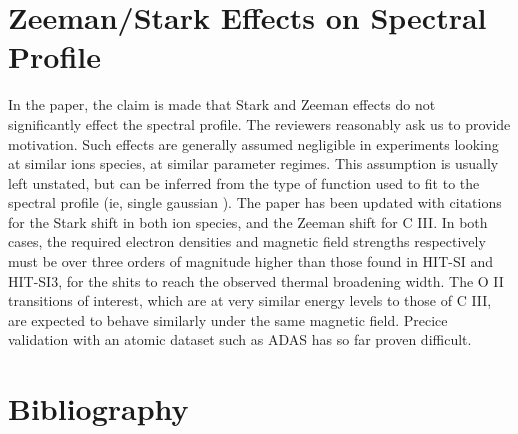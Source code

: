 \documentclass[]{AIAA}
\begin{document}
\section{Zeeman/Stark Effects on Spectral Profile}
\hspace*{4ex}In the paper, the claim is made that Stark and Zeeman effects do not significantly effect the spectral profile. The reviewers reasonably ask us to provide motivation. Such effects are generally assumed negligible in experiments looking at similar ions species, at similar parameter regimes\cite{cothran2006fast}. This assumption is usually left unstated, but can be inferred from the type of function used to fit to the spectral profile (ie, single gaussian \cite{den2006advances}). The paper has been updated with citations for the Stark shift in both ion species\cite{Konjevic2002}, and the Zeeman shift for C III\cite{Carolan1985}. In both cases, the required electron densities and magnetic field strengths respectively must be over three orders of magnitude higher than those found in HIT-SI and HIT-SI3, for the shits to reach the observed thermal broadening width. The O II transitions of interest, which are at very similar energy levels to those of C III, are expected to behave similarly under the same magnetic field. Precice validation with an atomic dataset such as ADAS has so far proven difficult.

\newpage
\section{Bibliography}

\end{document}
